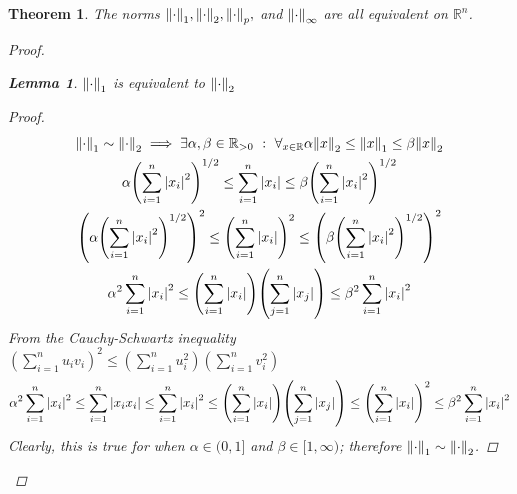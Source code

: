\documentclass[]{article}
\newcommand{\R}{\mathbb{R}}
\newcommand{\st}{\ : \ }
\newtheorem{theorem}{Theorem}
\newtheorem{lemma}{Lemma}
\begin{document}
\begin{theorem}
    The norms $\norm{\cdot}_1,\norm{\cdot}_2,\norm{\cdot}_p,$ and $\norm{\cdot}_\infty$ are all equivalent on $\R^n$.
    \begin{proof}
        \begin{lemma}
            $\norm{\cdot}_1$ is equivalent to $\norm{\cdot}_2$
            \begin{proof}
                \begin{multline*} 
                    \norm{\cdot}_1 \sim \norm{\cdot}_2 
                        \implies \exists{\alpha,\beta \in \R_{>0}} \st \forall_{x\in \R}
                        \alpha \norm{x}_2 \leq \norm{x}_1 \leq \beta \norm{x}_2\\
                    \alpha \qty(\sum_{i=1}^n \abs{x_i}^2)^{1/2} \leq \sum_{i=1}^n \abs{x_i} \leq \beta \qty(\sum_{i=1}^n \abs{x_i}^2)^{1/2}\\
                    \qty(\alpha \qty(\sum_{i=1}^n \abs{x_i}^2)^{1/2})^2 
                        \leq \qty(\sum_{i=1}^n \abs{x_i})^2 
                        \leq \qty(\beta \qty(\sum_{i=1}^n \abs{x_i}^2)^{1/2})^2\\
                    \alpha^2 \sum_{i=1}^n \abs{x_i}^2 
                        \leq \qty(\sum_{i=1}^n \abs{x_i}) \qty(\sum_{j=1}^n \abs{x_j}) 
                        \leq \beta^2 \sum_{i=1}^n \abs{x_i}^2\\
                \end{multline*}
                From the Cauchy-Schwartz inequality $(\sum_{i=1}^n u_i v_i)^2 \leq (\sum_{i=1}^n u_i^2) (\sum_{i=1}^n v_i^2)$
                \begin{multline*}
                    \alpha^2 \sum_{i=1}^n \abs{x_i}^2 
                        \leq \sum_{i=1}^n \abs{x_i x_i}
                        \leq \sum_{i=1}^n \abs{x_i}^2
                        \leq \qty(\sum_{i=1}^n \abs{x_i}) \qty(\sum_{j=1}^n \abs{x_j}) 
                        \leq \qty(\sum_{i=1}^n \abs{x_i})^2
                        \leq \beta^2 \sum_{i=1}^n \abs{x_i}^2\\
                \end{multline*}
                Clearly, this is true for when $\alpha \in (0,1]$ and $\beta \in [1,\infty)$; therefore $\norm{\cdot}_1 \sim \norm{\cdot}_2$.

\end{proof}
\end{lemma}
\end{proof}
\end{theorem}
\end{document}
